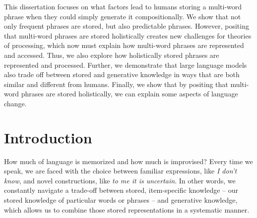 \documentclass[
  12pt,
  letterpaper,
]{scrreport}
\begin{document}
This dissertation focuses on what factors lead to humans storing a
multi-word phrase when they could simply generate it compositionally. We
show that not only frequent phrases are stored, but also predictable
phrases. However, positing that multi-word phrases are stored
holistically creates new challenges for theories of processing, which
now must explain how multi-word phrases are represented and accessed.
Thus, we also explore how holistically stored phrases are represented
and processed. Further, we demonstrate that large language models also
trade off between stored and generative knowledge in ways that are both
similar and different from humans. Finally, we show that by positing
that multi-word phrases are stored holistically, we can explain some
aspects of language change.

\singlespacing


\chapter{Introduction}\label{introduction}


\doublespacing

How much of language is memorized and how much is improvised? Every time
we speak, we are faced with the choice between familiar expressions,
like \emph{I don't know}, and novel constructions, like \emph{to me it
is uncertain}. In other words, we constantly navigate a trade-off
between stored, item-specific knowledge -- our stored knowledge of
particular words or phrases -- and generative knowledge, which allows us
to combine those stored representations in a systematic manner.
\end{document}
